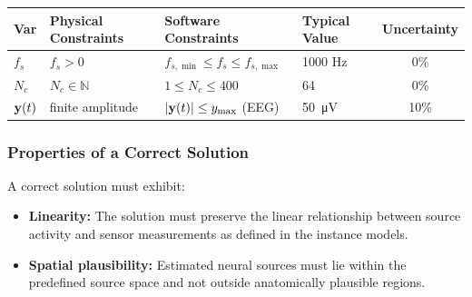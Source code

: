 \documentclass[12pt]{article}
\begin{document}
\begin{table}[!h]
\caption{Input Variables} \label{TblInputVar}
\renewcommand{\arraystretch}{1.2}
\noindent \begin{longtable*}{l l l l c} 
\toprule
\textbf{Var} & \textbf{Physical Constraints} & \textbf{Software Constraints} &
                            \textbf{Typical Value} & \textbf{Uncertainty}\\
\midrule 

    $f_s$ &
    $f_s > 0$ &
    $f_{s,\min} \leq f_s \leq f_{s,\max}$ &
    1000 Hz &
    0\% \\

    $N_c$ &
    $N_c \in \mathbb{N}$ &
    $1 \leq N_c \leq 400$ &
    64 &
    0\% \\

    ${\bf y}(t)$ &
    finite amplitude &
    $|{\bf y}(t)| \leq y_{\max}$ (EEG) &
    50~\si{\micro\volt} &
    10\% \\

\bottomrule
\end{longtable*}
\end{table}




\subsubsection{Properties of a Correct Solution} \label{sec_CorrectSolution}

\noindent
A correct solution must exhibit:


\begin{itemize}

    \item \textbf{Linearity:}
    The solution must preserve the linear relationship between source activity and sensor measurements as defined in the instance models.

    \item \textbf{Spatial plausibility:}
    Estimated neural sources must lie within the predefined source space and not outside anatomically plausible regions.

\end{itemize}
\end{document}
